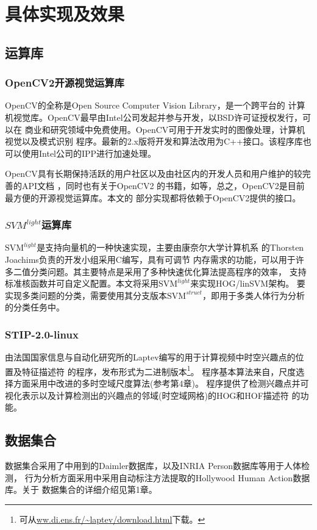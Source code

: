 \chapter{具体实现及效果}
\section{运算库}
\subsection{OpenCV2开源视觉运算库}
OpenCV\cite{opencv}的全称是Open Source Computer Vision Library，是一个跨平台的
计算机视觉库。OpenCV最早由Intel公司发起并参与开发，以BSD许可证授权发行，可以在
商业和研究领域中免费使用。OpenCV可用于开发实时的图像处理，计算机视觉以及模式识别
程序。最新的2.x版将开发和算法改用为C++接口。该程序库也可以使用Intel公司的IPP进行加速处理。

OpenCV具有长期保持活跃的用户社区以及由社区内的开发人员和用户维护的较完善的API文档
\cite{opencvdoc}，同时也有关于OpenCV2
的书籍，如\cite{opencvbook}等，总之，OpenCV2是目前最方便的开源视觉运算库。本文的
部分实现都将依赖于OpenCV2提供的接口。

\subsection{$SVM^{light}$运算库}
$\mathrm{SVM}^{light}$\cite{SVMLight}是支持向量机的一种快速实现，主要由康奈尔大学计算机系
的Thorsten Joachims负责的开发小组采用C编写，具有可调节
内存需求的功能，可以用于许多二值分类问题。其主要特点是采用了多种快速优化算法提高程序的效率，
支持标准核函数并可自定义配置。本文将采用$\mathrm{SVM}^{light}$来实现HOG/linSVM架构。
要实现多类问题的分类，需要使用其分支版本$\mathrm{SVM}^{struct}$，即用于多类人体行为分析
的分类任务中。

\subsection{STIP-2.0-linux}
由法国国家信息与自动化研究所的Laptev编写的用于计算视频中时空兴趣点的位置及特征描述符
的程序，发布形式为二进制版本\footnote{可从\url{ww.di.ens.fr/~laptev/download.html}下载。}。
程序基本算法来自\cite{ostip}，尺度选择方面采用\cite{stip}中改进的多时空域尺度算法(参考第4章)。
程序提供了检测兴趣点并可视化表示以及计算检测出的兴趣点的邻域(时空域网格)的HOG和HOF描述符
的功能。
\section{数据集合}
数据集合采用了\cite{survey}中用到的Daimler数据库，以及INRIA Person数据库等用于人体检测，
行为分析方面采用\cite{stip}中采用自动标注方法提取的Hollywood Human Action数据库。关于
数据集合的详细介绍见第1章。
